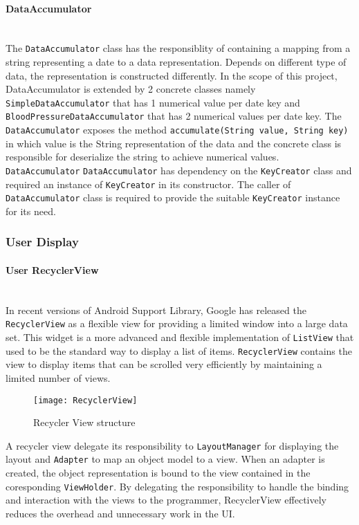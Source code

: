 \paragraph{DataAccumulator}\mbox{} \\
The \texttt{DataAccumulator} class has the responsiblity of containing a mapping from a string representing a date to a
data representation. Depends on different type of data, the representation is constructed differently. In the scope of
this project, DataAccumulator is extended by 2 concrete classes namely \texttt{SimpleDataAccumulator} that has 1
numerical value per date key and \texttt{BloodPressureDataAccumulator} that has 2 numerical values per date key. The
\texttt{DataAccumulator} exposes the method \texttt{accumulate(String value, String key)} in which value is the String
representation of the data and the concrete class is responsible for deserialize the string to achieve numerical values.
\texttt{DataAccumulator}
\texttt{DataAccumulator} has dependency on the \texttt{KeyCreator} class and required an instance of \texttt{KeyCreator}
in its constructor. The caller of \texttt{DataAccumulator} class is required to provide the suitable \texttt{KeyCreator}
instance for its need.

\subsubsection{User Display}
\paragraph{User RecyclerView} \mbox{} \\
In recent versions of Android Support Library, Google has released the \texttt{RecyclerView} as a flexible view for
providing a limited window into a large data set. This widget is a more advanced and flexible implementation of
\texttt{ListView} that used to be the standard way to display a list of items. \texttt{RecyclerView} contains the view
to display items that can be scrolled very efficiently by maintaining a limited number of views\cite{RecyclerView}.
\begin{figure}[h]
    \centering
    \texttt{[image: RecyclerView]}
    \caption{Recycler View structure}
\end{figure}
A recycler view delegate its responsibility to \texttt{LayoutManager} for displaying the layout and \texttt{Adapter} to
map an object model to a view. When an adapter is created, the object representation is bound to the view contained in
the coresponding \texttt{ViewHolder}. By delegating the responsibility to handle the binding and interaction with the
views to the programmer, RecyclerView effectively reduces the overhead and unnecessary work in the UI.

